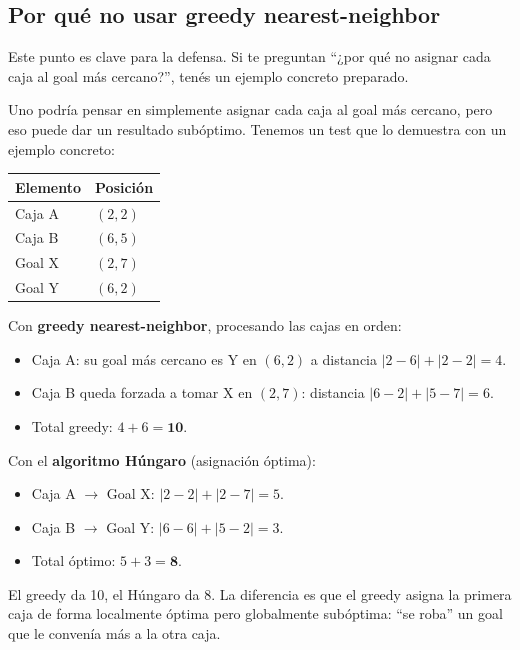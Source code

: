 \documentclass[12pt, a4paper]{article}
\begin{document}
\subsection{Por qué no usar greedy nearest-neighbor}

\begin{notapresentador}
Este punto es clave para la defensa. Si te preguntan ``¿por qué no asignar cada caja al goal más cercano?'', tenés un ejemplo concreto preparado.
\end{notapresentador}

Uno podría pensar en simplemente asignar cada caja al goal más cercano, pero eso puede dar un resultado subóptimo. Tenemos un test que lo demuestra con un ejemplo concreto:

\begin{center}
\begin{tabular}{ll}
\toprule
\textbf{Elemento} & \textbf{Posición} \\
\midrule
Caja A & $(2, 2)$ \\
Caja B & $(6, 5)$ \\
Goal X & $(2, 7)$ \\
Goal Y & $(6, 2)$ \\
\bottomrule
\end{tabular}
\end{center}

Con \textbf{greedy nearest-neighbor}, procesando las cajas en orden:
\begin{itemize}
  \item Caja A: su goal más cercano es Y en $(6,2)$ a distancia $|2{-}6| + |2{-}2| = 4$.
  \item Caja B queda forzada a tomar X en $(2,7)$: distancia $|6{-}2| + |5{-}7| = 6$.
  \item Total greedy: $4 + 6 = \mathbf{10}$.
\end{itemize}

Con el \textbf{algoritmo Húngaro} (asignación óptima):
\begin{itemize}
  \item Caja A $\to$ Goal X: $|2{-}2| + |2{-}7| = 5$.
  \item Caja B $\to$ Goal Y: $|6{-}6| + |5{-}2| = 3$.
  \item Total óptimo: $5 + 3 = \mathbf{8}$.
\end{itemize}

El greedy da 10, el Húngaro da 8. La diferencia es que el greedy asigna la primera caja de forma localmente óptima pero globalmente subóptima: ``se roba'' un goal que le convenía más a la otra caja.
\end{document}
